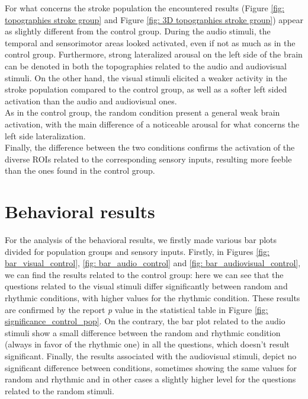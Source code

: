 For what concerns the stroke population the encountered results (Figure \ref{fig: topographies stroke group} and Figure \ref{fig: 3D topographies stroke group}) appear as slightly different from the control group. During the audio stimuli, the temporal and sensorimotor areas looked activated, even if not as much as in the control group. Furthermore, strong lateralized arousal on the left side of the brain can be denoted in both the topographies related to the audio and audiovisual stimuli. On the other hand, the visual stimuli elicited a weaker activity in the stroke population compared to the control group, as well as a softer left sided activation than the audio and audiovisual ones. \\
As in the control group, the random condition present a general weak brain activation, with the main difference of a noticeable arousal for what concerns the left side lateralization. \\
Finally, the difference between the two conditions confirms the activation of the diverse ROIs related to the corresponding sensory inputs, resulting more feeble than the ones found in the control group. 

\section{Behavioral results}
For the analysis of the behavioral results, we firstly made various bar plots divided for population groups and sensory inputs. Firstly, in Figures \ref{fig: bar_visual_control}, \ref{fig: bar_audio_control} and \ref{fig: bar_audiovisual_control}, we can find the results related to the control group: here we can see that the questions related to the visual stimuli differ significantly between random and rhythmic conditions, with higher values for the rhythmic condition. These results are confirmed by the report \textit{p} value in the statistical table in Figure \ref{fig: significance_control_pop}. On the contrary, the bar plot related to the audio stimuli show a small difference between the random and rhythmic condition (always in favor of the rhythmic one) in all the questions, which doesn't result significant. Finally, the results associated with the audiovisual stimuli, depict no significant difference between conditions, sometimes showing the same values for random and rhythmic and in other cases a slightly higher level for the questions related to the random stimuli. 

